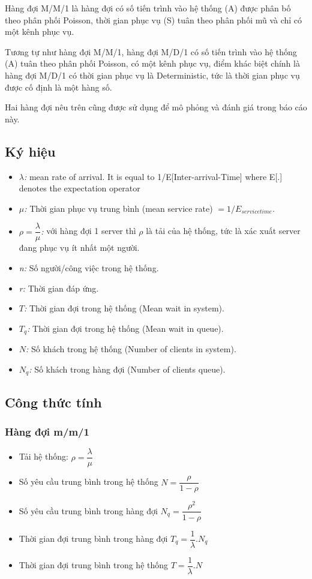 \documentclass[a4paper]{article}
\begin{document}
\par 
Hàng đợi M/M/1 là hàng đợi có số tiến trình vào hệ thống (A) được phân bố theo phân phối Poisson, thời gian phục vụ (S) tuân theo phân phối mũ và chỉ có một kênh phục vụ. 
\par
Tương tự như hàng đợi M/M/1, hàng đợi M/D/1 có số tiến trình vào hệ thống (A) tuân theo phân phối Poisson, có một kênh phục vụ, điểm khác biệt chính là hàng đợi M/D/1 có thời gian phục vụ là Deterministic, tức là thời gian phục vụ được cố định là một hàng số.
\par\noindent
Hai hàng đợi nêu trên cũng được sử dụng để mô phỏng và đánh giá trong báo cáo này.
\subsection{Ký hiệu}
\begin{itemize}
\item[]  \textit{$\lambda$:} mean rate of arrival. It is equal to 1/E[Inter-arrival-Time] where E[.] denotes the expectation operator
\item[] \textit{$\mu$:} Thời gian phục vụ trung bình (mean service rate) $=1/E_{service time}$. 
\item[] \textit{$\rho = \dfrac{\lambda}{\mu}$:} với hàng đợi 1 server thì $\rho$ là tải của hệ thống, tức là xác xuất server đang phục vụ ít nhất một người.  
\item[] \textit{n:} Số người/công việc trong hệ thống. 
\item[] \textit{r:} Thời gian đáp ứng.
\item[] \textit{$T$:} Thời gian đợi trong hệ thống (Mean wait in system).
\item[] \textit{$T_q$:} Thời gian đợi trong hệ thống (Mean wait in queue).
\item[] \textit{$N$:} Số khách trong hệ thống (Number of clients in system).
\item[] \textit{$N_q$:} Số khách trong hàng đợi (Number of clients queue).
\end{itemize}
\subsection{Công thức tính}
\subsubsection{Hàng đợi m/m/1}
\begin{itemize}
\item Tải hệ thống: $\rho = \dfrac{\lambda}{\mu}$
\item Số yêu cầu trung bình trong hệ thống $N=\dfrac{\rho}{1-\rho}$
\item Số yêu cầu trung bình trong hàng đợi $N_q=\dfrac{\rho^2}{1-\rho}$
\item Thời gian đợi trung bình trong hàng đợi $T_q=\dfrac{1}{\lambda}.N_q$
\item Thời gian đợi trung bình trong hệ thống $T=\dfrac{1}{\lambda}.N$
\end{itemize}
\end{document}
